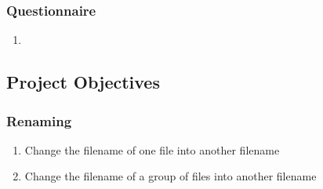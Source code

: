 \documentclass[11pt]{article}
\begin{document}
\subsubsection{Questionnaire}
\begin{enumerate}
    \item
\end{enumerate}

\subsection{Project Objectives}
\subsubsection{Renaming}
\begin{enumerate}
    \item Change the filename of one file into another filename
    \item Change the filename of a group of files into another filename
\end{enumerate}
\end{document}
